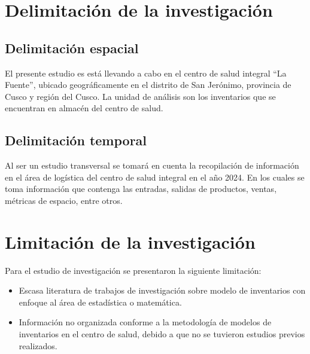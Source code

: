 \section{Delimitación de la investigación}

\subsection{Delimitación espacial}
El presente estudio es está llevando a cabo en el centro de salud integral ``La Fuente'', ubicado geográficamente en el distrito de San Jerónimo, provincia de Cusco y región del Cusco. La unidad de análisis son los inventarios que se encuentran en almacén del centro de salud.
\subsection{Delimitación temporal}
Al ser un estudio transversal se tomará en cuenta la recopilación de información en el área de logística del centro de salud integral en el año 2024. En los cuales se toma información que contenga las entradas, salidas de productos, ventas, métricas de espacio, entre otros.

\section{Limitación de la investigación}

Para el estudio de investigación se presentaron la siguiente limitación:
\begin{itemize}
	\item Escasa literatura de trabajos de investigación sobre modelo de inventarios con enfoque al área de estadística o matemática.
	\item Información no organizada conforme a la metodología de modelos de inventarios en el centro de salud, debido a que no se tuvieron estudios previos realizados.  
\end{itemize}
